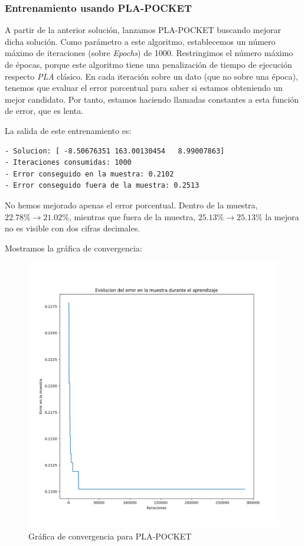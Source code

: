 \documentclass[11pt]{article}
\begin{document}
\subsubsection{Entrenamiento usando PLA-POCKET}

A partir de la anterior solución, lanzamos PLA-POCKET buscando mejorar dicha solución. Como parámetro a este algoritmo, establecemos un número máximo de iteraciones (sobre \emph{Epochs}) de 1000. Restringimos el número máximo de épocas, porque este algoritmo tiene una penalización de tiempo de ejecución respecto \emph{PLA} clásico. En cada iteración sobre un dato (que no sobre una época), tenemos que evaluar el error porcentual para saber si estamos obteniendo un mejor candidato. Por tanto, estamos haciendo llamadas constantes a esta función de error, que es lenta.

La salida de este entrenamiento es:

\begin{lstlisting}[caption={Salida del entrenamiento de PLA-POCKET}, captionpos=b]
- Solucion: [ -8.50676351 163.00130454   8.99007863]
- Iteraciones consumidas: 1000
- Error conseguido en la muestra: 0.2102
- Error conseguido fuera de la muestra: 0.2513
\end{lstlisting}

No hemos mejorado apenas el error porcentual. Dentro de la muestra, $22.78\% \rightarrow 21.02\%$, mientras que fuera de la muestra, $25.13\% \rightarrow 25.13\%$ la mejora no es visible con dos cifras decimales.

Mostramos la gráfica de convergencia:

\begin{figure}[H]
    \centering
    \includegraphics[scale=0.4]{pla_pocket_convergencia}
    \caption{Gráfica de convergencia para PLA-POCKET}
\end{figure}
\end{document}
